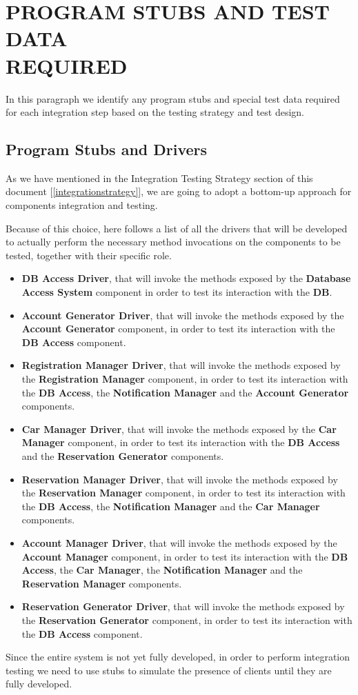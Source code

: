 \section{PROGRAM STUBS AND TEST DATA \\REQUIRED}
In this paragraph we identify any program stubs and special test data required for each integration step based on the testing strategy and test design. 

\subsection{Program Stubs and Drivers}
As we have mentioned in the Integration Testing Strategy section of this document [\ref{integrationstrategy}], we are going to adopt a bottom-up approach for components integration and testing.

Because of this choice, here follows a list of all the drivers that will be developed to actually perform the necessary method invocations on the components to be tested, together with their specific role.

\begin{itemize}
	\item \textbf{DB Access Driver}, that will invoke the methods exposed by the \textbf{Database Access System} component in order to test its interaction with the \textbf{DB}.
	\item \textbf{Account Generator Driver}, that will invoke the methods exposed by the \textbf{Account Generator} component, in order to test its interaction with the \textbf{DB Access} component.
	\item \textbf{Registration Manager Driver}, that will invoke the methods exposed by the \textbf{Registration Manager} component, in order to test its interaction with the \textbf{DB Access}, the \textbf{Notification Manager} and the \textbf{Account Generator} components.
	\item \textbf{Car Manager Driver}, that will invoke the methods exposed by the \textbf{Car Manager} component, in order to test its interaction with the \textbf{DB Access} and the \textbf{Reservation Generator} components.
	\item \textbf{Reservation Manager Driver}, that will invoke the methods exposed by the \textbf{Reservation Manager} component, in order to test its interaction with the \textbf{DB Access}, the \textbf{Notification Manager} and the \textbf{Car Manager} components.
	\item \textbf{Account Manager Driver}, that will invoke the methods exposed by the \textbf{Account Manager} component, in order to test its interaction with the \textbf{DB Access}, the \textbf{Car Manager}, the \textbf{Notification Manager} and the \textbf{Reservation Manager} components.
	\item \textbf{Reservation Generator Driver}, that will invoke the methods exposed by the \textbf{Reservation Generator} component, in order to test its interaction with the \textbf{DB Access} component.
\end{itemize}
Since the entire system is not yet fully developed, in order to perform integration testing we need to use stubs to simulate the presence of clients until they are fully developed.

